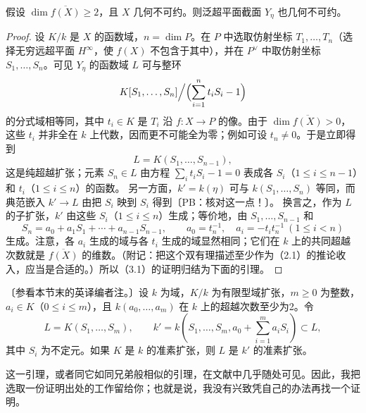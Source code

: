 假设 $\dim\overline{f(X)}\geq2$，且 $X$ 几何不可约。则泛超平面截面 $Y_\eta$ 也几何不可约。
\begin{proof}
设 $K/k$ 是 $X$ 的函数域，$n=\dim P$。在 $P$ 中选取仿射坐标 $T_1,\ldots,T_n$（选择无穷远超平面 $H^\infty$，使 $f(X)$ 不包含于其中），并在 $P^\vee$ 中取仿射坐标 $S_1,\ldots,S_n$。可见 $Y_\eta$ 的函数域 $L$ 可与整环
\[
 K[S_1,\ldots,S_n]\Big/\Bigl(\sum_{i=1}^n t_iS_i-1\Bigr)
\]
的分式域相等同，其中 $t_i\in K$ 是 $T_i$ 沿 $f:X\to P$ 的像。由于 $\dim\overline{f(X)}>0$，这些 $t_i$ 并非全在 $k$ 上代数，因而更不可能全为零；例如可设 $t_n\ne0$。于是立即得到
\[
 L=K(S_1,\ldots,S_{n-1}),
\]
这是纯超越扩张；元素 $S_n\in L$ 由方程 $\sum_it_iS_i-1=0$ 表成各 $S_i$（$1\leq i\leq n-1$）和 $t_i$（$1\leq i\leq n$）的函数。
另一方面，$k'=k(\eta)$ 可与 $k(S_1,\ldots,S_n)$ 等同，而典范嵌入 $k'\to L$ 由把 $S_i$ 映到 $S_i$ 得到〔PB：核对这一点！〕。
换言之，作为 $L$ 的子扩张，$k'$ 由这些 $S_i$（$1\leq i\leq n$）生成；等价地，由 $S_1,\ldots,S_{n-1}$ 和
\[
 S_n=a_0+a_1S_1+\cdots+a_{n-1}S_{n-1},
 \qquad a_0=t_n^{-1},\quad a_i=-t_it_n^{-1}\ (1\leq i<n)
\]
生成。注意，各 $a_i$ 生成的域与各 $t_i$ 生成的域显然相同；它们在 $k$ 上的共同超越次数就是 $\overline{f(X)}$ 的维数。（附记：把这个双有理描述至少作为（2.1）的推论收入，应当是合适的。）所以（3.1）的证明归结为下面的引理。
\end{proof}

〔参看本节末的英译编者注。〕设 $k$ 为域，$K/k$ 为有限型域扩张，$m\geq0$ 为整数，$a_i\in K$（$0\leq i\leq m$），且 $k(a_0,\ldots,a_m)$ 在 $k$ 上的超越次数至少为2。令
\[
 L=K(S_1,\ldots,S_m),\qquad
 k'=k\left(S_1,\ldots,S_m,a_0+\sum_{i=1}^m a_iS_i\right)\subset L,
\]
其中 $S_i$ 为不定元。如果 $K$ 是 $k$ 的准素扩张，则 $L$ 是 $k'$ 的准素扩张。

这一引理，或者同它如同兄弟般相似的引理，在文献中几乎随处可见。因此，我把选取一份证明出处的工作留给你；也就是说，我没有兴致凭自己的办法再找一个证明。

